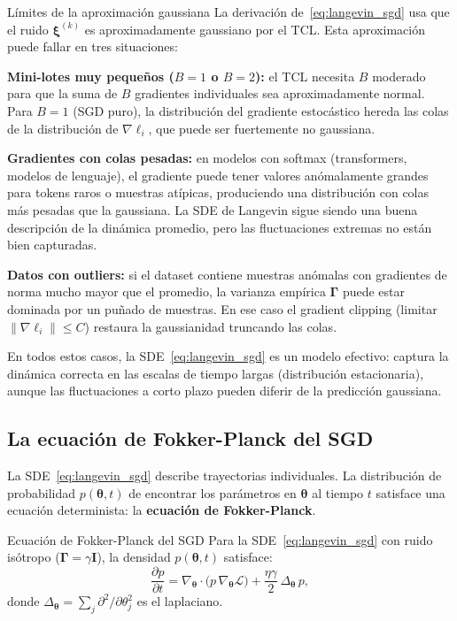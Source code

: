 \begin{observacion}{Límites de la aproximación gaussiana}
\label{obs:limites_gauss}
La derivación de~\eqref{eq:langevin_sgd} usa que el ruido $\bm{\xi}^{(k)}$
es aproximadamente gaussiano por el TCL. Esta aproximación puede fallar en
tres situaciones:

\textbf{Mini-lotes muy pequeños ($B = 1$ o $B = 2$):} el TCL necesita
$B$ moderado para que la suma de $B$ gradientes individuales sea
aproximadamente normal. Para $B = 1$ (SGD puro), la distribución del
gradiente estocástico hereda las colas de la distribución de
$\nabla\ell_i$, que puede ser fuertemente no gaussiana.

\textbf{Gradientes con colas pesadas:} en modelos con softmax
(transformers, modelos de lenguaje), el gradiente puede tener valores
anómalamente grandes para tokens raros o muestras atípicas, produciendo
una distribución con colas más pesadas que la gaussiana. La SDE de Langevin
sigue siendo una buena descripción de la dinámica promedio, pero las
fluctuaciones extremas no están bien capturadas.

\textbf{Datos con outliers:} si el dataset contiene muestras anómalas
con gradientes de norma mucho mayor que el promedio, la varianza empírica
$\bm{\Gamma}$ puede estar dominada por un puñado de muestras. En ese caso
el gradient clipping (limitar $\|\nabla\ell_i\| \leq C$) restaura la
gaussianidad truncando las colas.

En todos estos casos, la SDE~\eqref{eq:langevin_sgd} es un modelo
efectivo: captura la dinámica correcta en las escalas de tiempo largas
(distribución estacionaria), aunque las fluctuaciones a corto plazo pueden
diferir de la predicción gaussiana.
\end{observacion}

\subsection{La ecuación de Fokker-Planck del SGD}
\label{subsec:fp_sgd}

La SDE~\eqref{eq:langevin_sgd} describe trayectorias individuales. La
distribución de probabilidad $p(\bm{\theta},t)$ de encontrar los
parámetros en $\bm{\theta}$ al tiempo $t$ satisface una ecuación
determinista: la \textbf{ecuación de Fokker-Planck}.

\begin{teorema}{Ecuación de Fokker-Planck del SGD}
\label{thm:fp_sgd}
Para la SDE~\eqref{eq:langevin_sgd} con ruido isótropo ($\bm{\Gamma} =
\gamma\bm{I}$), la densidad $p(\bm{\theta},t)$ satisface:
\begin{equation}
  \frac{\partial p}{\partial t}
  = \nabla_{\bm{\theta}}\cdot\bigl(p\,\nabla_{\bm{\theta}}
  \mathcal{L}\bigr)
  + \frac{\eta\gamma}{2}\,\Delta_{\bm{\theta}}\,p,
  \label{eq:fp_sgd}
\end{equation}
donde $\Delta_{\bm{\theta}} = \sum_j \partial^2/\partial\theta_j^2$ es
el laplaciano.
\end{teorema}

